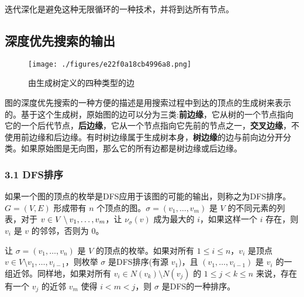 迭代深化是避免这种无限循环的一种技术，并将到达所有节点。

\subsection{深度优先搜索的输出}
\begin{figure}[ht]
\centering
\texttt{[image: ./figures/e22f0a18cb4996a8.png]}
\caption{由生成树定义的四种类型的边} \label{fig_SDYXSS_2}
\end{figure}
图的深度优先搜索的一种方便的描述是用搜索过程中到达的顶点的生成树来表示的。基于这个生成树，原始图的边可以分为三类:\textbf{前边缘}，它从树的一个节点指向它的一个后代节点，\textbf{后边缘}，它从一个节点指向它先前的节点之一，\textbf{交叉边缘}，不使用前边缘和后边缘。有时树边缘属于生成树本身，\textbf{树边缘}的边与前向边分开分类。如果原始图是无向图，那么它的所有边都是树边缘或后边缘。
\subsubsection{3.1 DFS排序}
如果一个图的顶点的枚举是DFS应用于该图的可能的输出，则称之为DFS排序。$G = (V, E)$ 形成带有 $n$ 个顶点的图。$\sigma = (v_1, \ldots, v_m)$ 是 $V$ 的不同元素的列表，对于 $v \in V \setminus \\{v_1, \ldots, v_m}$，让 $\nu_\sigma(v)$ 成为最大的 $i$，如果这样一个 $i$ 存在，则 $v_i$ 是 $v$ 的邻邻，否则为 $0$。

让 $\sigma = (v_1, \ldots, v_n)$ 是 $V$ 的顶点的枚举。如果对所有 $1 \leq i \leq n$，$v_i$ 是顶点 $v \in V \setminus {v_1, \ldots, v_{i-1}}$，则枚举 $\sigma$ 是DFS排序(有源 $v_1$)，且 $(v_1, \ldots, v_{i-1})$ 是 $v_i$ 的一组近邻。同样地，如果对所有 $v_i \in N(v_k) \setminus N(v_j)$ 的 $1 \leq j < k \leq n$ 来说，存在有一个 $v_j$ 的近邻 $v_m$ 使得 $i < m < j$，则 $\sigma$ 是DFS的一种排序。
